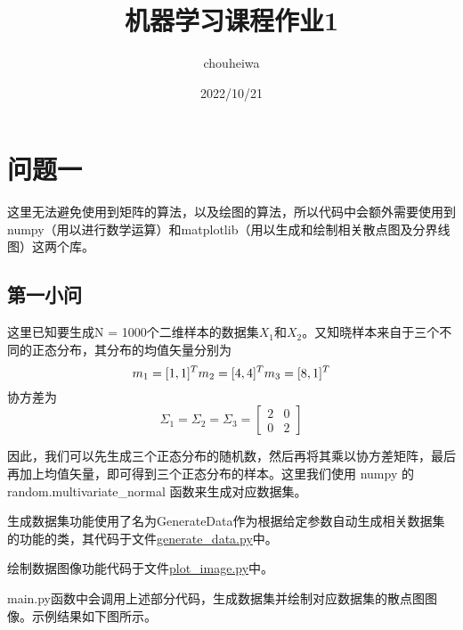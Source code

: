 \documentclass[UTF8]{article} %
\title{机器学习课程作业1}
\author{chouheiwa}
\date{2022/10/21}
\begin{document}
    \maketitle


    \section{问题一}
    这里无法避免使用到矩阵的算法，以及绘图的算法，所以代码中会额外需要使用到numpy（用以进行数学运算）和matplotlib（用以生成和绘制相关散点图及分界线图）这两个库。

    \subsection{第一小问}
    这里已知要生成N = 1000个二维样本的数据集$X_1$和$X_2$。又知晓样本来自于三个不同的正态分布，其分布的均值矢量分别为
    \[
        m_1 = [1, 1]^T\\m_2 = [4, 4]^T\\m_3 = [8, 1]^T
    \]
    协方差为
    \[
        \Sigma_1 = \Sigma_2 = \Sigma_3 = \begin{bmatrix}
                                             2 & 0 \\ 0 & 2
        \end{bmatrix}
    \]

    因此，我们可以先生成三个正态分布的随机数，然后再将其乘以协方差矩阵，最后再加上均值矢量，即可得到三个正态分布的样本。这里我们使用 numpy 的 random.multivariate\_normal 函数来生成对应数据集。

    生成数据集功能使用了名为GenerateData作为根据给定参数自动生成相关数据集的功能的类，其代码于文件\href{run:generate_data.py}{generate\_data.py}中。

    绘制数据图像功能代码于文件\href{run:plot_image.py}{plot\_image.py}中。

    main.py函数中会调用上述部分代码，生成数据集并绘制对应数据集的散点图图像。示例结果如下图所示。
\end{document}
